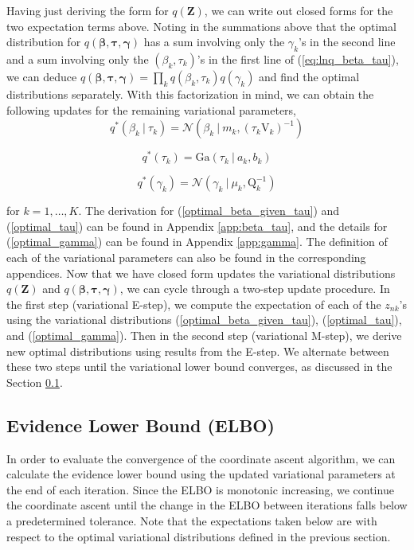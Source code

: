 \documentclass[twoside,11pt]{article}
\newcommand\given[1][]{\:#1\vert\:}
\newcommand{\kprod}{\prod_{k}}
\newcommand{\boldbeta}{\boldsymbol\beta}
\newcommand{\boldgamma}{\boldsymbol\gamma}
\newcommand{\boldtau}{\boldsymbol\tau}
\begin{document}
Having just deriving the form for $q(\mathbf{Z})$, we can write out closed forms for the two expectation terms above. Noting in the summations above that the optimal distribution for $q(\boldbeta, \boldtau, \boldgamma)$ has a sum involving only the $\gamma_k$'s in the second line and a sum involving only the $(\beta_k, \tau_k)$'s in the first line of (\ref{eq:lnq_beta_tau}), we can deduce $q(\boldbeta, \boldtau, \boldgamma) = \kprod q(\beta_k, \tau_k) q(\gamma_k)$ and find the optimal distributions separately. With this factorization in mind, we can obtain the following updates for the remaining variational parameters,
\begin{equation} \label{optimal_beta_given_tau}
	q^{*}(\beta_k \given \tau_k) = \mathcal{N}\left(\beta_k \given m_k, (\tau_k \mathrm{V}_k)^{-1} \right)
\end{equation}

\begin{equation} \label{optimal_tau}
	q^{*}(\tau_k) =  \mathrm{Ga}\left( \tau_k \given a_k, b_k \right)
\end{equation}

\begin{equation} \label{optimal_gamma}
	q^{*}(\gamma_k) = \mathcal{N} \left( \gamma_k \given \mu_k, \mathrm{Q}_k^{-1} \right)
\end{equation}

for $k = 1, \ldots, K$. The derivation for (\ref{optimal_beta_given_tau}) and (\ref{optimal_tau}) can be found in Appendix \ref{app:beta_tau}, and the details for (\ref{optimal_gamma}) can be found in Appendix \ref{app:gamma}. The definition of each of the variational parameters can also be found in the corresponding appendices. Now that we have closed form updates the variational distributions $q(\mathbf{Z})$ and $q(\boldbeta, \boldtau, \boldgamma)$, we can cycle through a two-step update procedure. In the first step (variational E-step), we compute the expectation of each of the $z_{nk}$'s using the variational distributions (\ref{optimal_beta_given_tau}), (\ref{optimal_tau}), and (\ref{optimal_gamma}). Then in the second step (variational M-step), we derive new optimal distributions using results from the E-step. We alternate between these two steps until the variational lower bound converges, as discussed in the Section \ref{sub:elbo}. 


\subsection{Evidence Lower Bound (ELBO)} \label{sub:elbo}
In order to evaluate the convergence of the coordinate ascent algorithm, we can calculate the evidence lower bound using the updated variational parameters at the end of each iteration. Since the ELBO is monotonic increasing, we continue the coordinate ascent until the change in the ELBO between iterations falls below a predetermined tolerance. Note that the expectations taken below are with respect to the optimal variational distributions defined in the previous section.
\end{document}

